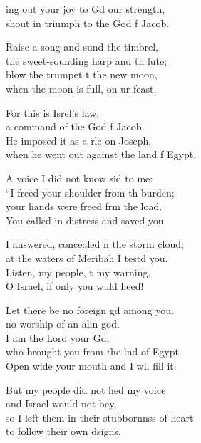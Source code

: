 \begin{psalmverse}
  \begin{patverse}
ing out your joy to Gd our strength,\Med\\
shout in triumph to the God f Jacob.

Raise a song and sund the timbrel,\Med\\
the sweet-sounding harp and th lute;\\
blow the trumpet t the new moon,\Med\\
when the moon is full, on ur feast.

For this is Isrel’s law,\Med\\
a command of the God f Jacob.\\
He imposed it as a rle on Joseph,\Med\\
when he went out against the land f Egypt.

A voice I did not know sid to me:\Med\\
“I freed your shoulder from th burden;\\
your hands were freed frm the load.\Med\\
You called in distress and  saved you.

I answered, concealed \pointup{\i}n the storm cloud;\Med\\
at the waters of Meribah I testd you.\\
Listen, my people, t my warning.\Med\\
O Israel, if only you wuld heed!

Let there be no foreign gd among you.\Med\\
no worship of an alin god.\\
I am the Lord your Gd,\Flex\\
who brought you from the lnd of Egypt.\Med\\
Open wide your mouth and I w\pointup{\i}ll fill it.

But my people did not hed my voice\Med\\
and Israel would not bey,\\
so I left them in their stubbornnss of heart\Med\\
to follow their own dsigns.


\end{patverse}
\end{psalmverse}
